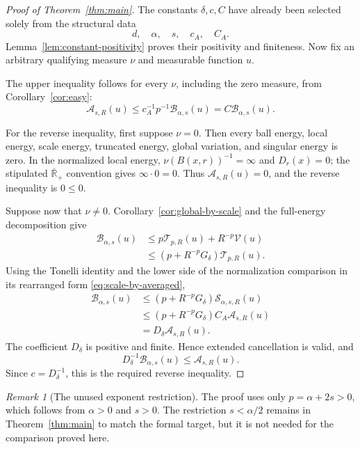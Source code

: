 \documentclass[11pt]{article}
\theoremstyle{remark}
\newtheorem{remark}[theorem]{Remark}
\newcommand{\Rbarp}{\overline{\mathbb R}_{+}}
\newcommand{\Aenergy}{\mathcal A}
\newcommand{\Senergy}{\mathcal S}
\newcommand{\Tenergy}{\mathcal T}
\newcommand{\Benergy}{\mathcal B}
\newcommand{\Venergy}{\mathcal V}
\begin{document}
\begin{proof}[Proof of Theorem~\ref{thm:main}]
The constants \(\delta,c,C\) have already been selected solely from the
structural data
\[
  d,\quad\alpha,\quad s,\quad c_A,\quad C_A.
\]
Lemma~\ref{lem:constant-positivity} proves their positivity and finiteness.
Now fix an arbitrary qualifying measure \(\nu\) and measurable function
\(u\).

The upper inequality follows for every \(\nu\), including the zero measure,
from Corollary~\ref{cor:easy}:
\[
  \Aenergy_{s,R}(u)
  \leq
  c_A^{-1}p^{-1}\Benergy_{\alpha,s}(u)
  =
  C\Benergy_{\alpha,s}(u).
\]

For the reverse inequality, first suppose \(\nu=0\).  Then every ball
energy, local energy, scale energy, truncated energy, global variation, and
singular energy is zero.  In the normalized local energy,
\(\nu(B(x,r))^{-1}=\infty\) and \(D_r(x)=0\); the stipulated
\(\Rbarp\) convention gives \(\infty\cdot0=0\).  Thus
\(\Aenergy_{s,R}(u)=0\), and the reverse inequality is \(0\leq0\).

Suppose now that \(\nu\neq0\).  Corollary~\ref{cor:global-by-scale} and the
full-energy decomposition give
\begin{align*}
  \Benergy_{\alpha,s}(u)
  &\leq
  p\Tenergy_{p,R}(u)
  +
  R^{-p}\Venergy(u)\\
  &\leq
  \left(p+R^{-p}G_\delta\right)
  \Tenergy_{p,R}(u).
\end{align*}
Using the Tonelli identity and the lower side of the normalization
comparison in its rearranged form \eqref{eq:scale-by-averaged},
\begin{align*}
  \Benergy_{\alpha,s}(u)
  &\leq
  \left(p+R^{-p}G_\delta\right)
  \Senergy_{\alpha,s,R}(u)\\
  &\leq
  \left(p+R^{-p}G_\delta\right)
  C_A\Aenergy_{s,R}(u)\\
  &=
  D_\delta\Aenergy_{s,R}(u).
\end{align*}
The coefficient \(D_\delta\) is positive and finite.  Hence extended
cancellation is valid, and
\[
  D_\delta^{-1}\Benergy_{\alpha,s}(u)
  \leq
  \Aenergy_{s,R}(u).
\]
Since \(c=D_\delta^{-1}\), this is the required reverse inequality.
\end{proof}

\begin{remark}[The unused exponent restriction]
The proof uses only \(p=\alpha+2s>0\), which follows from
\(\alpha>0\) and \(s>0\).  The restriction \(s<\alpha/2\) remains in
Theorem~\ref{thm:main} to match the formal target, but it is not needed for
the comparison proved here.
\end{remark}
\end{document}
